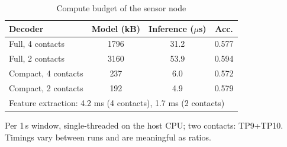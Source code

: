\begin{table}[!t]
\caption{Compute budget of the sensor node}
\label{tab:compute}
\centering\footnotesize
\begin{tabular}{lccc}
\toprule
Decoder & Model (kB) & Inference ($\mu$s) & Acc. \\
\midrule
Full, 4 contacts & 1796 & 31.2 & 0.577 \\
Full, 2 contacts & 3160 & 53.9 & 0.594 \\
Compact, 4 contacts & 237 & 6.0 & 0.572 \\
Compact, 2 contacts & 192 & 4.9 & 0.579 \\
\midrule
\multicolumn{4}{l}{Feature extraction: 4.2 ms (4 contacts), 1.7 ms (2 contacts)} \\
\bottomrule
\end{tabular}
\par\smallskip
\parbox{\columnwidth}{\footnotesize Per 1\,s window, single-threaded on the host CPU; two contacts: TP9+TP10. Timings vary between runs and are meaningful as ratios.}
\end{table}
